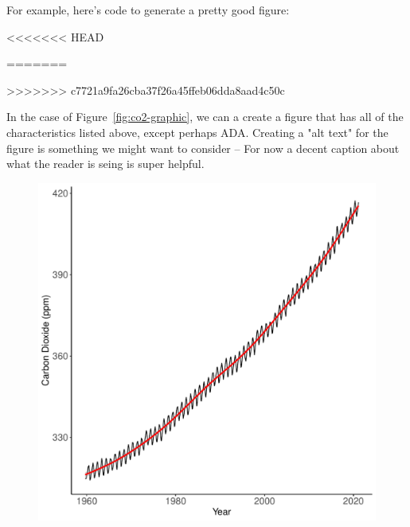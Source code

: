 \documentclass{book}\usepackage{knitr}
\begin{document}
For example, here's code to generate a pretty good figure: 



<<<<<<< HEAD

=======
\begin{knitrout}
\color{fgcolor}\begin{kframe}


{\ttfamily\noindent\bfseries{}}

{\ttfamily\noindent\bfseries\color{errorcolor}{\#\# Error in createDataPartition(., p = 0.8, list = FALSE): object 'maunaloa' not found}}
>>>>>>> c7721a9fa26cba37f26a45ffeb06dda8aad4c50c

In the case of Figure~\ref{fig:co2-graphic}, we can a create a figure that has all of the characteristics listed above, except perhaps ADA. Creating a "alt text" for the figure is something we might want to consider -- For now a decent caption about what the reader is seing is super helpful. 

\begin{figure}
\begin{knitrout}
\color{fgcolor}
\includegraphics[width=\maxwidth]{figure/maunaloa-1} 


\end{knitrout}
\end{figure}
\end{kframe}
\end{knitrout}
\end{document}
